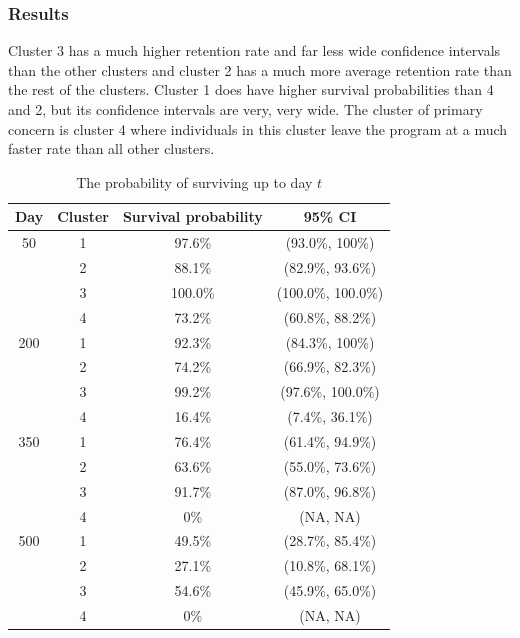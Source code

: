 \documentclass[12pt]{article}
\begin{document}
	\subsubsection{Results}
	
	Cluster 3 has a much higher retention rate and far less wide confidence intervals than the other clusters and cluster 2 has a much more average retention rate than the rest of the clusters. Cluster 1 does have higher survival probabilities than 4 and 2, but its confidence intervals are very, very wide. The cluster of primary concern is cluster 4 where individuals in this cluster leave the program at a much faster rate than all other clusters.
	
	\begin{table}[h]
		\begin{center}
			\begin{tabular}{|c|c|c|c|}
				\hline \textbf{Day} & \textbf{Cluster} & \textbf{Survival probability} & \textbf{95\% CI}\\
				\hline 50 & 1 & 97.6\% & (93.0\%, 100\%) \\
				\cline{2-4} & 2 & 88.1\% & (82.9\%, 93.6\%) \\
				\cline{2-4} & 3 & 100.0\% & (100.0\%, 100.0\%) \\
				\cline{2-4} & 4 & 73.2\% & (60.8\%, 88.2\%) \\
				\hline 200 & 1 & 92.3\% & (84.3\%, 100\%) \\
				\cline{2-4} & 2 & 74.2\% & (66.9\%, 82.3\%) \\
				\cline{2-4} & 3 & 99.2\% & (97.6\%, 100.0\%) \\
				\cline{2-4} & 4 & 16.4\% & (7.4\%, 36.1\%) \\
				\hline 350 & 1 & 76.4\% & (61.4\%, 94.9\%) \\
				\cline{2-4} & 2 & 63.6\% & (55.0\%, 73.6\%) \\
				\cline{2-4} & 3 & 91.7\% & (87.0\%, 96.8\%) \\
				\cline{2-4} & 4 & 0\% & (NA, NA) \\
				\hline 500 & 1 & 49.5\% & (28.7\%, 85.4\%) \\
				\cline{2-4} & 2 & 27.1\% & (10.8\%, 68.1\%) \\
				\cline{2-4} & 3 & 54.6\% & (45.9\%, 65.0\%) \\
				\cline{2-4} & 4 & 0\% & (NA, NA) \\
				\hline
			\end{tabular}
		\end{center}
		\caption{The probability of surviving up to day $t$}
		\label{table:surv_prob}
	\end{table}
	
\end{document}

